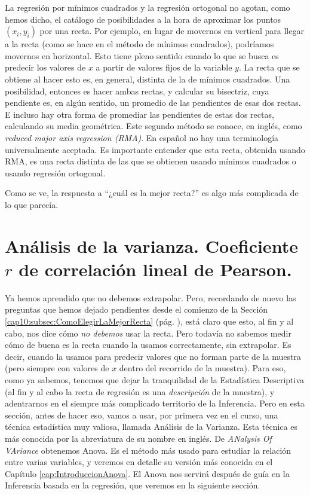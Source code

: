 La regresión por mínimos cuadrados y la regresión ortogonal no agotan, como hemos dicho, el catálogo de posibilidades a la hora de aproximar los puntos $(x_i, y_i)$ por una recta. Por ejemplo, en lugar de movernos en vertical para llegar a la recta (como se hace en el método de mínimos cuadrados), podríamos movernos en horizontal. Esto tiene pleno sentido cuando lo que se busca es predecir los valores de $x$ a partir de valores {\sf fijos} de la variable $y$. La recta que se obtiene al hacer esto es, en general, distinta de la de mínimos cuadrados. Una posibilidad, entonces es hacer ambas rectas, y calcular su bisectriz, cuya pendiente es, en algún sentido, un promedio de las pendientes de esas dos rectas. E incluso hay otra forma de promediar las pendientes de estas dos rectas, calculando su media geométrica. Este segundo método se conoce, en inglés, como {\em reduced major axis regression (RMA)}. En español no hay una terminología universalmente aceptada. Es importante entender que esta recta, obtenida usando RMA, es una recta distinta de las que se obtienen usando mínimos cuadrados o usando regresión ortogonal.

Como se ve, la respuesta a ``¿cuál es la mejor recta?'' es algo más complicada de lo que parecía.



\section{Análisis de la varianza. Coeficiente $r$ de correlación lineal de Pearson.}
\label{cap10:sec:AnovaCoeficienteCorrelacion}


Ya hemos aprendido que no debemos extrapolar. Pero, recordando de nuevo las preguntas que hemos dejado pendientes desde el comienzo de la Sección \ref{cap10:subsec:ComoElegirLaMejorRecta} (pág. \pageref{cap10:subsec:ComoElegirLaMejorRecta}), está claro que esto, al fin y al cabo, nos dice cómo {\em no debemos} usar la recta. Pero todavía no sabemos medir cómo de buena es la recta cuando la usamos correctamente, sin extrapolar. Es decir, cuando la usamos para predecir valores que no forman parte de la muestra (pero siempre con valores de $x$ dentro del recorrido de la muestra). Para eso, como ya sabemos, tenemos que dejar la tranquilidad de la Estadística Descriptiva (al fin y al cabo la recta de regresión es una {\em descripción} de la muestra), y adentrarnos en el siempre más complicado territorio de la Inferencia. Pero en esta sección, antes de hacer eso, vamos a usar, por primera vez en el curso, una técnica estadística muy valiosa, llamada Análisis de la Varianza. Esta técnica es más conocida por la abreviatura de su nombre en inglés. De {\em ANalysis Of VAriance} obtenemos Anova. Es el método más usado para estudiar la relación entre varias variables, y veremos en detalle su versión más conocida en el Capítulo \ref{cap:IntroduccionAnova}. El Anova nos servirá después de guía en la Inferencia basada en la regresión, que veremos en la siguiente sección.

